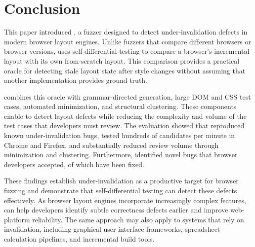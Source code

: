 \section{Conclusion}

This paper introduced \toolname, a fuzzer designed to detect
under-invalidation defects in modern browser layout engines.
Unlike fuzzers that compare different browsers or browser versions,
\toolname uses self-differential testing to compare a browser's incremental
layout with its own from-scratch layout. This comparison provides a practical
oracle for detecting stale layout state after style changes without assuming
that another implementation provides ground truth.

\toolname combines this oracle with grammar-directed generation, large DOM and
CSS test cases, automated minimization, and structural clustering. These
components enable \toolname to detect layout defects while reducing the
complexity and volume of the test cases that developers must review. The
evaluation showed that \toolname reproduced known under-invalidation bugs,
tested hundreds of candidates per minute in Chrome and Firefox, and
substantially reduced review volume through minimization and clustering.
Furthermore, \toolname identified \NumBugsNovel{} novel bugs that browser
developers accepted, of which \NumBugsFixed{} have been fixed.

These findings establish under-invalidation as a productive target for browser
fuzzing and demonstrate that self-differential testing can detect these
defects effectively. As browser layout engines incorporate increasingly
complex features, \toolname can help developers identify subtle correctness
defects earlier and improve web-platform reliability. The same approach may
also apply to systems that rely on invalidation, including graphical user
interface frameworks, spreadsheet-calculation pipelines, and incremental
build tools.
